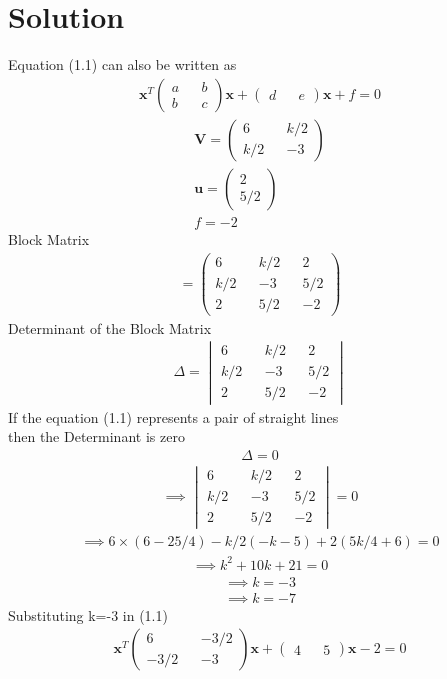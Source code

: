 \documentclass[journal,13pt,twocolumn]{IEEEtran}
\newcommand{\myvec}[1]{\ensuremath{\begin{pmatrix}#1\end{pmatrix}}}
\newcommand{\mydet}[1]{\ensuremath{\begin{vmatrix}#1\end{vmatrix}}}
\renewcommand{\vec}[1]{\mathbf{#1}}
\begin{document}
\section{\textbf{Solution}}
Equation (1.1) can also be written as 
\begin{align}
\vec{x}^T \myvec{a && b \\ b && c} \vec{x} + \myvec{d && e}\vec{x} + f = 0
\end{align}
\begin{equation}
\begin{split}
\vec{V}=\myvec{6 && k/2\\ k/2 && -3}\\
\vec{u}=\myvec{2\\5/2}\\
f= -2
\end{split}
\end{equation}
Block Matrix
\begin{align}
 = \myvec{6 && k/2 && 2\\ k/2 && -3 && 5/2\\2 && 5/2 && -2}
\end{align}
Determinant of the Block Matrix
\begin{align}
\Delta = \mydet{6 && k/2 && 2\\ k/2 && -3 && 5/2\\2 && 5/2 && -2}
\end{align}
If the equation (1.1) represents a pair of straight lines\\
then the Determinant is zero
\begin{align}
\Delta = 0
\end{align}
\begin{align}
\implies \mydet{6 && k/2 && 2\\ k/2 && -3 && 5/2\\2 && 5/2 && -2} = 0
\end{align}
\begin{align}
\implies 6\times(6-25/4)-k/2(-k-5)+2(5k/4+6) = 0
\end{align}
\begin{align}
\implies k^2 + 10k + 21 = 0
\end{align}
\begin{align}
\implies \boxed{ k = -3 }
\end{align}
\begin{align}
\implies \boxed{ k = -7 }
\end{align}
Substituting k=-3 in (1.1)
\begin{align}
\vec{x}^T \myvec{6 && -3/2 \\ -3/2 && -3} \vec{x} + \myvec{4 && 5}\vec{x} -2 = 0
\end{align}
\end{document}
